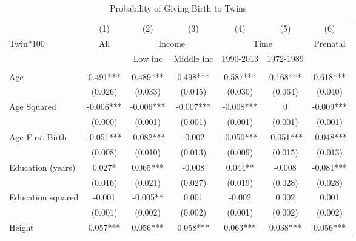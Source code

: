 \begin{landscape}\begin{table}[htpb!] 
\caption{Probability of Giving Birth to Twins} \label{TWINtab:twinreg1} 
\begin{center}\begin{tabular}{lcccccc} \toprule \toprule 
&(1)&(2)&(3)&(4)&(5)&(6)\\
Twin*100&All&\multicolumn{2}{c}{Income}&\multicolumn{2}{c}{Time}&Prenatal\\
 \cmidrule(r){3-4} \cmidrule(r){5-6} 
&&Low inc&Middle inc&1990-2013&1972-1989&\\\midrule
\begin{footnotesize}\end{footnotesize}&\begin{footnotesize}\end{footnotesize}&\begin{footnotesize}\end{footnotesize}&\begin{footnotesize}\end{footnotesize}&\begin{footnotesize}\end{footnotesize}&\begin{footnotesize}\end{footnotesize}&\begin{footnotesize}\end{footnotesize}\\
Age&0.491***&0.489***&0.498***&0.587***&0.168***&0.618***\\
&(0.026)&(0.033)&(0.045)&(0.030)&(0.064)&(0.040)\\
Age Squared&-0.006***&-0.006***&-0.007***&-0.008***&0&-0.009***\\
&(0.000)&(0.001)&(0.001)&(0.001)&(0.001)&(0.001)\\
Age First Birth&-0.051***&-0.082***&-0.002&-0.050***&-0.051***&-0.048***\\
&(0.008)&(0.010)&(0.013)&(0.009)&(0.015)&(0.013)\\
Education (years)&0.027*&0.065***&-0.008&0.044**&-0.008&-0.081***\\
&(0.016)&(0.021)&(0.027)&(0.019)&(0.028)&(0.028)\\
Education squared&-0.001&-0.005**&0.001&-0.002&0.002&0.001\\
&(0.001)&(0.002)&(0.002)&(0.001)&(0.002)&(0.002)\\
Height&0.057***&0.056***&0.058***&0.063***&0.038***&0.056***\\

\end{tabular}
\end{center}
\end{table}
\end{landscape}
